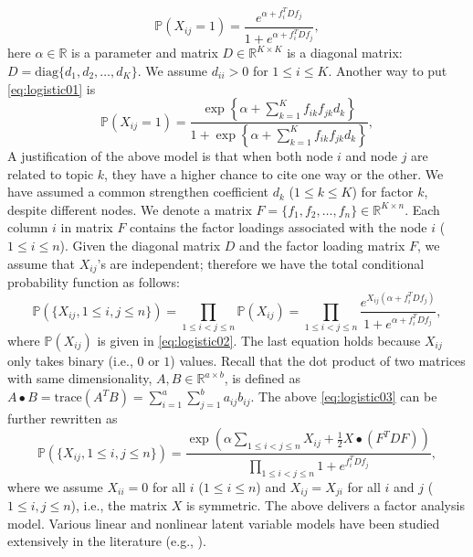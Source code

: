 \documentclass{article}
\begin{document}
\begin{equation} 
\label{eq:logistic01}
\mathbb{P}(X_{ij}=1) = \frac{e^{\alpha + f_i^T D f_j }}{1 + e^{\alpha + f_i^T D f_j }},
\end{equation}
here $\alpha \in \mathbb{R}$ is a parameter and matrix $D \in \mathbb{R}^{K \times K}$ is a diagonal matrix: $D = \mbox{diag}\{d_{1},d_{2},\ldots,d_{K}\}$. We assume $d_{ii} > 0$ for $1 \le i \le K$.
Another way to put \eqref{eq:logistic01} is
\begin{equation}
\label{eq:logistic02}
\mathbb{P}(X_{ij}=1) = \frac{\exp\left\{\alpha + \sum_{k=1}^K f_{ik}f_{jk}d_{k} \right\}}{1 + \exp\left\{\alpha + \sum_{k=1}^K f_{ik}f_{jk}d_{k} \right\}},
\end{equation}
A justification of the above model is that when both node $i$ and node $j$ are related to topic $k$, they have a higher chance to cite one way or the other. We have assumed a common strengthen coefficient $d_k$ ($1\le k \le K$) for factor $k$, despite different nodes. We denote a matrix $F = \{f_1, f_2, \ldots, f_n\} \in \mathbb{R}^{K \times n}$. Each column $i$ in matrix $F$ contains the factor loadings associated with the node $i$ ($1\le i \le n$). Given the diagonal matrix $D$ and the factor loading matrix $F$, we assume that $X_{ij}$'s are independent; therefore we have the total conditional probability function as follows: 
\begin{equation}
\label{eq:logistic03}
\mathbb{P}(\{X_{ij}, 1\le i,j \le n\})
= \prod_{1\le i<j \le n} \mathbb{P}(X_{ij})
= \prod_{1\le i<j \le n}  \frac{e^{X_{ij}(\alpha + f_i^T D f_j) }}{1 + e^{\alpha + f_i^T D f_j }},
\end{equation}
where $\mathbb{P}(X_{ij})$ is given in \eqref{eq:logistic02}.
The last equation holds because $X_{ij}$ only takes binary (i.e., $0$ or $1$) values.
Recall that the dot product of two matrices with same dimensionality, $A,B\in \mathbb{R}^{a \times b}$, is defined as $A\bullet B=\mbox{trace}(A^T B) = \sum_{i=1}^a\sum_{j=1}^b a_{ij}b_{ij}$.
The above \eqref{eq:logistic03} can be further rewritten as
\begin{equation}
\label{eq:logistic04}
\mathbb{P}(\{X_{ij}, 1\le i,j \le n\})
= \frac{\exp(\alpha \sum_{1\le i< j\le n}X_{ij} +\frac{1}{2} X \bullet (F^T D F))}{\prod_{1\le i<j \le n}  1 + e^{f_i^T D f_j }},
\end{equation}
where we assume $X_{ii}=0$ for all $i$ ($1\le i \le n$) and $X_{ij} = X_{ji}$ for all $i$ and $j$ ($1\le i,j \le n$), i.e., the matrix $X$ is symmetric.
The above delivers a factor analysis model. Various linear and nonlinear latent variable models have been studied extensively in the literature (e.g., \cite{joreskog1969general,mcdonald1985factor, harman1976modern,rasch1960probabilistic,lord1968statistical,karl1973general}).
\end{document}
